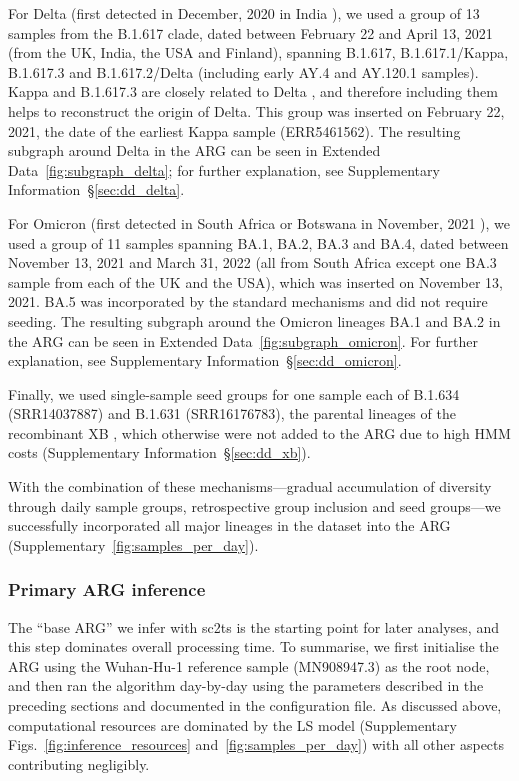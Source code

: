 \documentclass[12pt]{article}
\makeatletter
\newcommand{\supref}[1]{Supplementary Information~\S\ref{#1}}
\newcommand{\edref}[1]{Extended Data~\ref{#1}}
\newcommand{\siref}[1]{Supplementary~\ref{#1}}
\newcommand{\refprefix}[1]{#1~}
\newcommand{\numref}[1]{{\let\refprefix\@gobble\ref{#1}}}
\makeatother
\begin{document}
For Delta
(first detected in December, 2020 in India \cite{ECDCVOCUpdates}),
we used a group of 13 samples from the B.1.617 clade,
dated between February 22 and April 13, 2021
(from the UK, India, the USA and Finland),
spanning B.1.617, B.1.617.1/Kappa, B.1.617.3
and B.1.617.2/Delta (including early AY.4 and AY.120.1 samples).
Kappa and B.1.617.3 are closely related to Delta
\cite{Stern2021,Cherian2021}, and
therefore including them helps to reconstruct the origin of Delta.
This group was inserted on February 22, 2021, the date of
the earliest Kappa sample (ERR5461562).
The resulting subgraph around Delta in the ARG
can be seen in \edref{fig:subgraph_delta};
for further explanation, see \supref{sec:dd_delta}.

For Omicron
(first detected in South Africa or Botswana
in November, 2021 \cite{ECDCVOCUpdates}),
we used a group of 11 samples spanning BA.1, BA.2, BA.3 and BA.4,
dated between November 13, 2021 and March 31, 2022
(all from South Africa except one BA.3 sample from each of the UK and the USA),
which was inserted on November 13, 2021.
BA.5 was incorporated by the standard mechanisms
and did not require seeding.
The resulting subgraph around the Omicron lineages BA.1 and BA.2 in the ARG
can be seen in \edref{fig:subgraph_omicron}.
For further explanation, see \supref{sec:dd_omicron}.

Finally, we used single-sample seed groups for one sample each
of B.1.634 (SRR14037887) and B.1.631 (SRR16176783), the parental lineages of the
recombinant XB \cite{Gutierrez2022}, which
otherwise were not added to the ARG due to high HMM costs
(\supref{sec:dd_xb}).

With the combination of these mechanisms---gradual accumulation
of diversity through daily sample groups, retrospective group
inclusion and seed groups---we successfully incorporated all major
lineages in the dataset into the ARG (\siref{fig:samples_per_day}).


\subsubsection*{Primary ARG inference}
The ``base ARG'' we infer with sc2ts is the starting point for later analyses,
and this step dominates overall processing time. To summarise, we first
initialise the ARG using the Wuhan-Hu-1 reference sample (MN908947.3) as the
root node, and then ran the algorithm day-by-day using the parameters
described in the preceding sections and documented in the configuration file.
As discussed above,
computational resources are dominated by the LS model
(Supplementary Figs.~\numref{fig:inference_resources} and~\numref{fig:samples_per_day}) with all
other aspects contributing negligibly.
\end{document}
